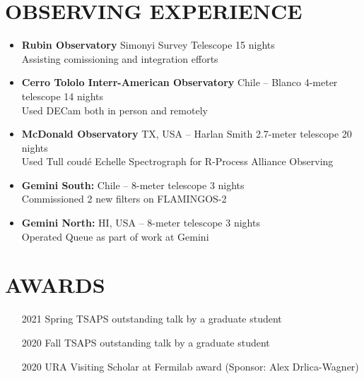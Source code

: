 \documentclass[11pt,letterpaper, sans]{moderncv}        %
\begin{document}
\section{OBSERVING EXPERIENCE}
\begin{itemize}[itemsep=1pt, leftmargin=2pt]
    \item \textbf{Rubin Observatory} Simonyi Survey Telescope \hfill 15 nights\\
    Assisting comissioning and integration efforts
    \item \textbf{Cerro Tololo Interr-American Observatory} Chile -- Blanco 4-meter telescope \hfill 14 nights\\
           Used DECam both in person and remotely
    \item \textbf{McDonald Observatory} TX, USA -- Harlan Smith 2.7-meter telescope \hfill 20 nights\\
           Used Tull coud\'e Echelle Spectrograph for R-Process Alliance Observing
    \item \textbf{Gemini South:} Chile -- 8-meter telescope \hfill 3 nights\\
           Commissioned 2 new filters on FLAMINGOS-2
    \item \textbf{Gemini North:} HI, USA -- 8-meter telescope \hfill 3 nights\\
           Operated Queue as part of work at Gemini
\end{itemize}

\section{AWARDS}
\begin{minipage}{\maincolumnwidth}%
	\small{
    	\begin{itemize}[itemsep=1pt, leftmargin=28pt]
          \item [2021] Spring TSAPS outstanding talk by a graduate student 
          \item [2020] Fall TSAPS outstanding talk by a graduate student 
          \item [2020] URA Visiting Scholar at Fermilab award (Sponsor: Alex Drlica-Wagner)
          \item []
		\end{itemize}}%
\end{minipage}%
\vspace{-4mm}      
\end{document}

